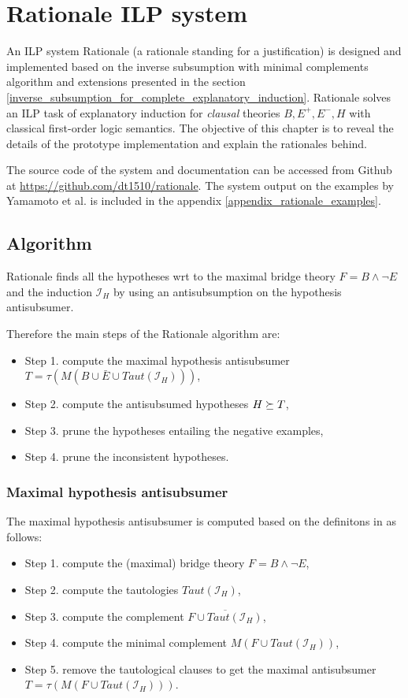 \chapter{Rationale ILP system}\label{chap:rationale_ilp_system}
An ILP system Rationale (a rationale standing for a justification) is designed and implemented based on the inverse subsumption with minimal complements algorithm and extensions presented in the section \ref{inverse_subsumption_for_complete_explanatory_induction}. Rationale solves an ILP task of explanatory induction for \emph{clausal} theories $B, E^+, E^-, H$ with classical first-order logic semantics. The objective of this chapter is to reveal the details of the prototype implementation and explain the rationales behind.

The source code of the system and documentation can be accessed from Github at 
\url{https://github.com/dt1510/rationale}. The system output on the examples by Yamamoto et al. \cite{yamamoto2012inverse} is included in the appendix \ref{appendix_rationale_examples}.

\section{Algorithm}
Rationale finds all the hypotheses wrt to the maximal bridge theory $F=B \land \neg E$ and the induction $\mathcal{I}_H$ by using an antisubsumption on the hypothesis antisubsumer.

Therefore the main steps of the Rationale algorithm are:
\begin{itemize}
\item Step 1. compute the maximal hypothesis antisubsumer
$T=\tau(M(B \cup \bar{E} \cup Taut(\mathcal{I}_H)))$,
\item Step 2. compute the antisubsumed hypotheses $H \succeq T$,
\item Step 3. prune the hypotheses entailing the negative examples,
\item Step 4. prune the inconsistent hypotheses.
\end{itemize}

\subsection{Maximal hypothesis antisubsumer}
The maximal hypothesis antisubsumer is computed based on the definitons in  as follows:

\begin{itemize}
\item Step 1. compute the (maximal) bridge theory $F=B \land \neg E$,
\item Step 2. compute the tautologies $Taut(\mathcal{I}_H)$,
\item Step 3. compute the complement $\overline{F \cup Taut(\mathcal{I}_H)}$,
\item Step 4. compute the minimal complement $M(F \cup Taut(\mathcal{I}_H))$,
\item Step 5. remove the tautological clauses to get the maximal antisubsumer $T=\tau(M(F \cup Taut(\mathcal{I}_H)))$.
\end{itemize}

